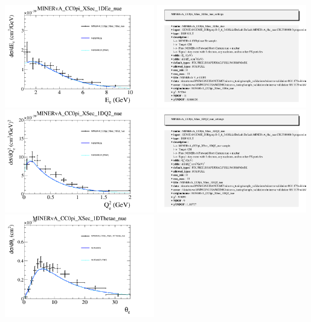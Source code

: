 \documentclass{article}
\begin{document}
\centering
\includegraphics[width=0.49\textwidth]{figures/nuisance_MINERvA_CC0pi_XSec_1DEe_nue_comp.png}
\includegraphics[width=0.49\textwidth]{figures/nuisance_MINERvA_CC0pi_XSec_1DEe_nue_info.png}
\centering
\includegraphics[width=0.49\textwidth]{figures/nuisance_MINERvA_CC0pi_XSec_1DQ2_nue_comp.png}
\includegraphics[width=0.49\textwidth]{figures/nuisance_MINERvA_CC0pi_XSec_1DQ2_nue_info.png}
\centering
\includegraphics[width=0.49\textwidth]{figures/nuisance_MINERvA_CC0pi_XSec_1DThetae_nue_comp.png}
\end{document}
